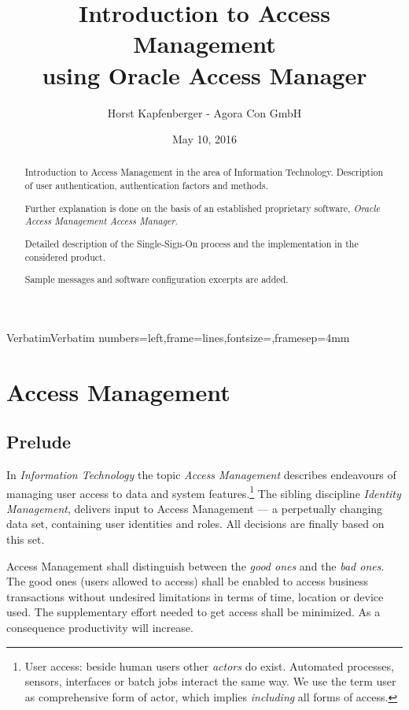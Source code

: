 \documentclass[11pt]{report}
\title{Introduction to Access Management \\
using Oracle Access Manager}
\author{Horst Kapfenberger - Agora Con GmbH}
\date{May 10, 2016}
\begin{document}
\RecustomVerbatimEnvironment
  {Verbatim}{Verbatim}
  {numbers=left,frame=lines,fontsize=\scriptsize,framesep=4mm}


\maketitle

\begin{abstract}
    Introduction to Access Management in the area of Information
    Technology.  Description of user authentication, authentication
    factors and methods.
   
    Further explanation is done on the basis of an established
    proprietary software, \emph{Oracle Access Management Access
    Manager}.
    
    Detailed description of the Single-Sign-On process and the
    implementation in the considered product.

    Sample messages and software configuration excerpts are added.
\end{abstract}


\tableofcontents


\chapter{Access Management}

\section{Prelude}

In \emph{Information Technology} the topic \emph{Access Management}
describes endeavours of managing user access to data and system
features.\footnote{User access:  beside human users other \emph{actors}
do exist.  Automated processes, sensors, interfaces or batch jobs
interact the same way.  We use the term user as comprehensive form of
actor, which implies \emph{including} all forms of access.} The sibling
discipline \emph{Identity Management}, delivers input to Access
Management --- a perpetually changing data set, containing user
identities and roles. All decisions are finally based on this set.

Access Management shall distinguish between the \emph{good ones} and the
\emph{bad ones}.  The good ones (users allowed to access) shall be
enabled to access business transactions without undesired limitations in
terms of time, location or device used. The supplementary effort needed
to get access shall be minimized.  As a consequence productivity will
increase.
\end{document}
